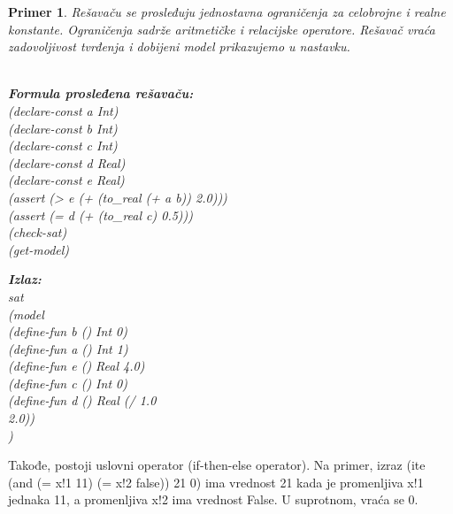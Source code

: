 \documentclass[12pt,oneside]{memoir}
\newcommand\tab[1][0.5cm]{\hspace*{#1}}
\newtheorem{primer}{Primer}
\begin{document}
\begin{primer} \label{example3} 
Rešavaču se prosleđuju jednostavna ograničenja za celobrojne i realne konstante.
Ograničenja sadrže aritmetičke i relacijske operatore. Rešavač vraća zadovoljivost tvrđenja i dobijeni model prikazujemo u nastavku.\\ \\
\begin{minipage}[b]{0.47\textwidth}
\textbf{Formula prosleđena rešavaču:}
\\(declare-const a Int)
\\(declare-const b Int)
\\(declare-const c Int)
\\(declare-const d Real)
\\(declare-const e Real)
\\(assert (> e (+ (to\_real (+ a b)) 2.0)))
\\(assert (= d (+ (to\_real c) 0.5)))
\\(check-sat)
\\(get-model)
\end{minipage}
\hspace{1.6cm}
\begin{minipage}[t]{0.4\textwidth}
\vspace{-6cm}
\textbf{Izlaz:}
\\sat 
\\(model
\\\tab(define-fun b () Int 0) 
\\\tab(define-fun a () Int 1) 
\\\tab(define-fun e () Real 4.0) 
\\\tab(define-fun c () Int 0) 
\\\tab(define-fun d () Real (/ 1.0 
\\\tab 2.0))
\\)
\end{minipage}

\end{primer}


Takođe, postoji uslovni operator (if-then-else operator). Na primer,
izraz (ite (and (= x!1 11) (= x!2 false)) 21 0) ima vrednost 21 kada je promenljiva x!1 jednaka 11, a promenljiva x!2 ima vrednost False. U suprotnom, vraća se 0.
\end{document}
